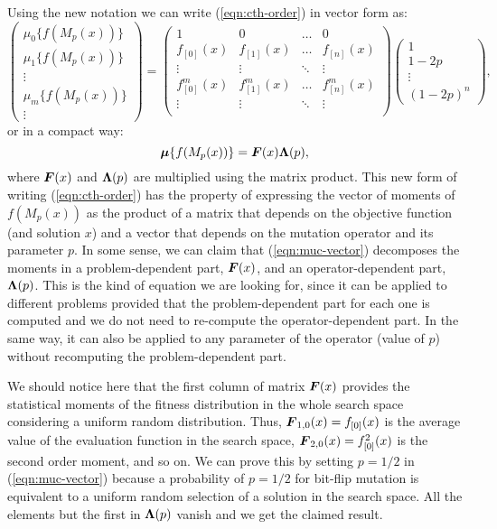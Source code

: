 \documentclass{article}
\def\vec#1{\mathchoice{\mbox{\boldmath$\displaystyle#1$}}
  {\mbox{\boldmath$\textstyle#1$}}
  {\mbox{\boldmath$\scriptstyle#1$}}
  {\mbox{\boldmath$\scriptscriptstyle#1$}}}
\begin{document}
Using the new notation we can write (\ref{eqn:cth-order}) in vector form as:
\begin{equation}
\nonumber
\left( \begin{array}{c}\mu_0\{f(M_p(x))\} \\ \mu_1\{f(M_p(x))\} \\ \vdots \\  \mu_m\{f(M_p(x))\} \\ \vdots \end{array}\right) = \left( \begin{array}{cccc} 
1 & 0 & \ldots & 0 \\
f_{[0]}(x) & f_{[1]}(x) & \ldots & f_{[n]}(x) \\
\vdots & \vdots & \ddots & \vdots \\
f^m_{[0]}(x) & f^m_{[1]}(x) & \ldots & f^m_{[n]}(x) \\
\vdots & \vdots & \ddots & \vdots \\
\end{array}\right) \left( \begin{array}{c}1 \\ 1-2p \\ \vdots \\  (1-2p)^n  \end{array} \right),
\end{equation}
or in a compact way:
\begin{equation}
\label{eqn:muc-vector}
\vec{\mu}\{f(M_p(x))\} = \vec{F}(x) \vec{\Lambda}(p),
\end{equation}
where $\vec{F}(x)$ and $\vec{\Lambda}(p)$ are multiplied using the matrix product. This new form of writing (\ref{eqn:cth-order}) has the property of expressing the vector of moments of $f(M_p(x))$ as the product of a matrix that depends on the objective function (and solution $x$) and a vector that depends on the mutation operator and its parameter $p$. In some sense, we can claim that (\ref{eqn:muc-vector}) decomposes the moments in a problem-dependent part, $\vec{F}(x)$, and an operator-dependent part, $\vec{\Lambda}(p)$. This is the kind of equation we are looking for, since it can be applied to different problems provided that the problem-dependent part for each one is computed and we do not need to re-compute the operator-dependent part. In the same way, it can also be applied to any parameter of the operator (value of $p$) without recomputing the problem-dependent part. 

We should notice here that the first column of matrix $\vec{F}(x)$ provides the statistical moments of the fitness distribution in the whole search space considering a uniform random distribution. Thus, $\vec{F}_{1,0}(x)=f_{[0]}(x)$ is the average value of the evaluation function in the search space, $\vec{F}_{2,0}(x)=f^2_{[0]}(x)$ is the second order moment, and so on. We can prove this by setting $p=1/2$ in (\ref{eqn:muc-vector}) because a probability of $p=1/2$ for bit-flip mutation is equivalent to a uniform random selection of a solution in the search space. All the elements but the first in $\vec{\Lambda}(p)$ vanish and we get the claimed result.
\end{document}

